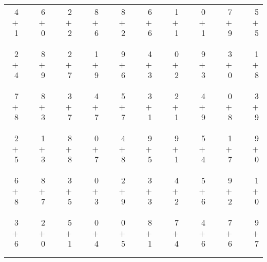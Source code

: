\documentclass[12pt, letterpaper]{article}
\begin{document}
\begin{tabular}{rrrrrrrrrrrrrrrrrrr}
4 & & 6 & & 2 & & 8 & & 8 & & 6 & & 1 & & 0 & & 7 & & 5\\
$+$ 1 & & $+$ 0 & & $+$ 2 & & $+$ 6 & & $+$ 2 & & $+$ 6 & & $+$ 1 & & $+$ 1 & & $+$ 9 & & $+$ 5\\
\cline{1-1} \cline{3-3} \cline{5-5} \cline{7-7} \cline{9-9} \cline{11-11} \cline{13-13} \cline{15-15} \cline{17-17} \cline{19-19} \\ \\
2 & & 8 & & 2 & & 1 & & 9 & & 4 & & 0 & & 9 & & 3 & & 1\\
$+$ 4 & & $+$ 9 & & $+$ 7 & & $+$ 9 & & $+$ 6 & & $+$ 3 & & $+$ 2 & & $+$ 3 & & $+$ 0 & & $+$ 8\\
\cline{1-1} \cline{3-3} \cline{5-5} \cline{7-7} \cline{9-9} \cline{11-11} \cline{13-13} \cline{15-15} \cline{17-17} \cline{19-19} \\ \\
7 & & 8 & & 3 & & 4 & & 5 & & 3 & & 2 & & 4 & & 0 & & 3\\
$+$ 8 & & $+$ 3 & & $+$ 7 & & $+$ 7 & & $+$ 7 & & $+$ 1 & & $+$ 1 & & $+$ 9 & & $+$ 8 & & $+$ 9\\
\cline{1-1} \cline{3-3} \cline{5-5} \cline{7-7} \cline{9-9} \cline{11-11} \cline{13-13} \cline{15-15} \cline{17-17} \cline{19-19} \\ \\
2 & & 1 & & 8 & & 0 & & 4 & & 9 & & 9 & & 5 & & 1 & & 9\\
$+$ 5 & & $+$ 3 & & $+$ 8 & & $+$ 7 & & $+$ 8 & & $+$ 5 & & $+$ 1 & & $+$ 4 & & $+$ 7 & & $+$ 0\\
\cline{1-1} \cline{3-3} \cline{5-5} \cline{7-7} \cline{9-9} \cline{11-11} \cline{13-13} \cline{15-15} \cline{17-17} \cline{19-19} \\ \\
6 & & 8 & & 3 & & 0 & & 2 & & 3 & & 4 & & 5 & & 9 & & 1\\
$+$ 8 & & $+$ 7 & & $+$ 5 & & $+$ 3 & & $+$ 9 & & $+$ 3 & & $+$ 2 & & $+$ 6 & & $+$ 2 & & $+$ 0\\
\cline{1-1} \cline{3-3} \cline{5-5} \cline{7-7} \cline{9-9} \cline{11-11} \cline{13-13} \cline{15-15} \cline{17-17} \cline{19-19} \\ \\
3 & & 2 & & 5 & & 0 & & 0 & & 8 & & 7 & & 4 & & 7 & & 9\\
$+$ 6 & & $+$ 0 & & $+$ 1 & & $+$ 4 & & $+$ 5 & & $+$ 1 & & $+$ 4 & & $+$ 6 & & $+$ 6 & & $+$ 7\\
\cline{1-1} \cline{3-3} \cline{5-5} \cline{7-7} \cline{9-9} \cline{11-11} \cline{13-13} \cline{15-15} \cline{17-17} \cline{19-19} \\ \\

\end{tabular}
\end{document}
